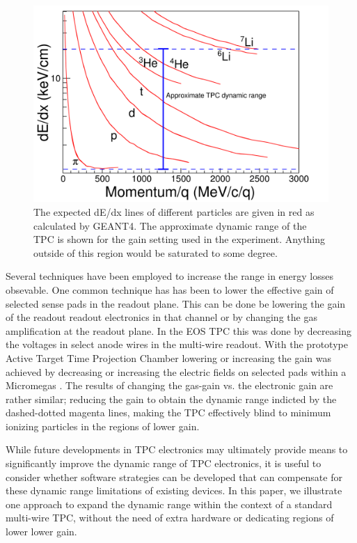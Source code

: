 \documentclass[review]{elsarticle}
\begin{document}
 
\begin{figure}[H]
\includegraphics[width=\linewidth]{intrographic}
\caption{The expected dE/dx lines of different particles are given in red as calculated by GEANT4. The approximate dynamic range of the TPC is shown for the gain setting used in the experiment. Anything outside of this region would be saturated to some degree.}
\label{fig:intro}
\end{figure}

Several techniques have been employed to increase the range in energy losses obsevable. One common technique has has been to lower the effective gain of selected sense pads in the readout plane. This can be done be lowering the gain of the readout readout electronics in that channel or by changing the gas amplification at the readout plane. In the EOS TPC \cite{eos} this was done by decreasing the voltages in select anode wires in the multi-wire readout. With the prototype Active Target Time Projection Chamber lowering or increasing the gain was achieved by decreasing or increasing the electric fields on selected pads within a Micromegas \cite{pattpc}. The results of changing the gas-gain vs. the electronic gain are rather similar; reducing the gain to obtain the dynamic range indicted by the dashed-dotted magenta lines, making the TPC effectively blind to minimum ionizing particles in the regions of lower gain. 

While future developments in TPC electronics may ultimately provide means to significantly improve the dynamic range of TPC electronics, it is useful to consider whether software strategies can be developed that can compensate for these dynamic range limitations of existing devices. In this paper, we illustrate one approach to expand the dynamic range within the context of a standard multi-wire TPC, without the need of extra hardware or dedicating regions of lower lower gain.
\end{document}
